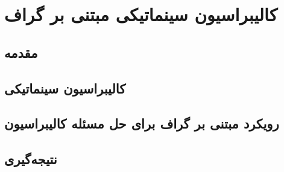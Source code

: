
\chapter{کالیبراسیون سینماتیکی مبتنی بر گراف}

\section{مقدمه}

\section{کالیبراسیون سینماتیکی}

\section{رویکرد مبتنی بر گراف برای حل مسئله کالیبراسیون}

\section{نتیجه‌گیری}
